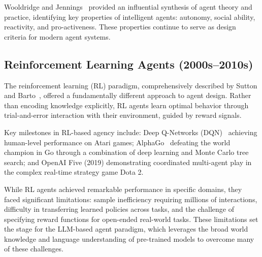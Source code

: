 \documentclass[11pt,a4paper]{article}
\begin{document}
Wooldridge and Jennings~\citep{wooldridge1995intelligent} provided an influential synthesis of agent theory and practice, identifying key properties of intelligent agents: autonomy, social ability, reactivity, and pro-activeness. These properties continue to serve as design criteria for modern agent systems.

\subsection{Reinforcement Learning Agents (2000s--2010s)}

The reinforcement learning (RL) paradigm, comprehensively described by Sutton and Barto~\citep{sutton2018reinforcement}, offered a fundamentally different approach to agent design. Rather than encoding knowledge explicitly, RL agents learn optimal behavior through trial-and-error interaction with their environment, guided by reward signals.

Key milestones in RL-based agency include: Deep Q-Networks (DQN)~\citep{mnih2015human} achieving human-level performance on Atari games; AlphaGo~\citep{silver2016mastering} defeating the world champion in Go through a combination of deep learning and Monte Carlo tree search; and OpenAI Five (2019) demonstrating coordinated multi-agent play in the complex real-time strategy game Dota 2.

While RL agents achieved remarkable performance in specific domains, they faced significant limitations: sample inefficiency requiring millions of interactions, difficulty in transferring learned policies across tasks, and the challenge of specifying reward functions for open-ended real-world tasks. These limitations set the stage for the LLM-based agent paradigm, which leverages the broad world knowledge and language understanding of pre-trained models to overcome many of these challenges.
\end{document}
